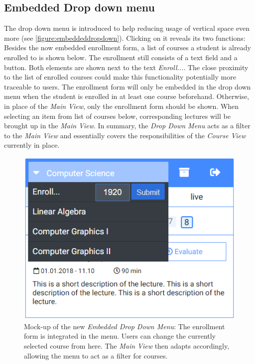 \subsection{Embedded Drop down menu}
\label{section:con:proposals:dropdown}
The drop down menu is introduced to help reducing usage of vertical space even more (see \autoref{figure:embeddeddropdown}). Clicking on it reveals its two functions: Besides the now embedded enrollment form, a list of courses a student is already enrolled to is shown below. The enrollment still consists of a text field and a button. Both elements are shown next to the text \emph{Enroll...}. The close proximity to the list of enrolled courses could make this functionality potentially more traceable to users. The enrollment form will only be embedded in the drop down menu when the student is enrolled in at least one course beforehand. Otherwise, in place of the \emph{Main View}, only the enrollment form should be shown.
When selecting an item from list of courses below, corresponding lectures will be brought up in the \emph{Main View}.
In summary, the \emph{Drop Down Menu} acts as a filter to the \emph{Main View} and essentially covers the responsibilities of the \emph{Course View} currently in place.

\begin{figure}[ht]
	\begin{minipage}[t]{\textwidth}
		\centering
		\includegraphics[width=.7\textwidth]{mockups/embedded_drop_down.png}
		\captionsetup{width=.8\linewidth}
		\caption{Mock-up of the new \emph{Embedded Drop Down Menu}:
			The enrollment form is integrated in the menu. Users can change the currently selected course from here. The \emph{Main View} then adapts accordingly, allowing the menu to act as a filter for courses.
		}
		\label{figure:embeddeddropdown}
	\end{minipage}
\end{figure}

